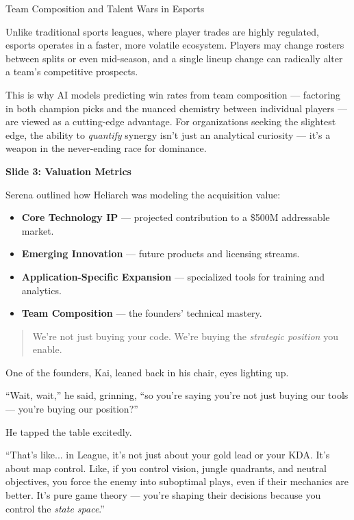 \begin{HistoricalSidebar}{Team Composition and Talent Wars in Esports}
        \medskip
        
        Unlike traditional sports leagues, where player trades are highly regulated, esports operates in a faster, more volatile ecosystem. Players may change rosters between splits or even mid-season, and a single lineup change can radically alter a team’s competitive prospects.
        
        \medskip
        
        This is why AI models predicting win rates from team composition — factoring in both champion picks and the nuanced chemistry between individual players — are viewed as a cutting-edge advantage.  
        For organizations seeking the slightest edge, the ability to \textit{quantify} synergy isn’t just an analytical curiosity — it’s a weapon in the never-ending race for dominance.
\end{HistoricalSidebar}
    
\textbf{Slide 3: Valuation Metrics} 

    Serena outlined how Heliarch was modeling the acquisition value:
    \begin{itemize}
        \item \textbf{Core Technology IP} — projected contribution to a \$500M addressable market.
        \item \textbf{Emerging Innovation} — future products and licensing streams.
        \item \textbf{Application-Specific Expansion} — specialized tools for training and analytics.
        \item \textbf{Team Composition} — the founders’ technical mastery.
    \end{itemize}

\begin{quote}
    We’re not just buying your code. We’re buying the \textit{strategic position} you enable.
\end{quote}

One of the founders, Kai, leaned back in his chair, eyes lighting up.

“Wait, wait,” he said, grinning, “so you’re saying you’re not just buying our tools — you’re buying our position?”

He tapped the table excitedly.

“That’s like... in League, it’s not just about your gold lead or your KDA. It’s about map control. Like, if you control vision, jungle quadrants, and neutral objectives, you force the enemy into suboptimal plays, even if their mechanics are better. It’s pure game theory — you’re shaping their decisions because you control the \textit{state space}.”

